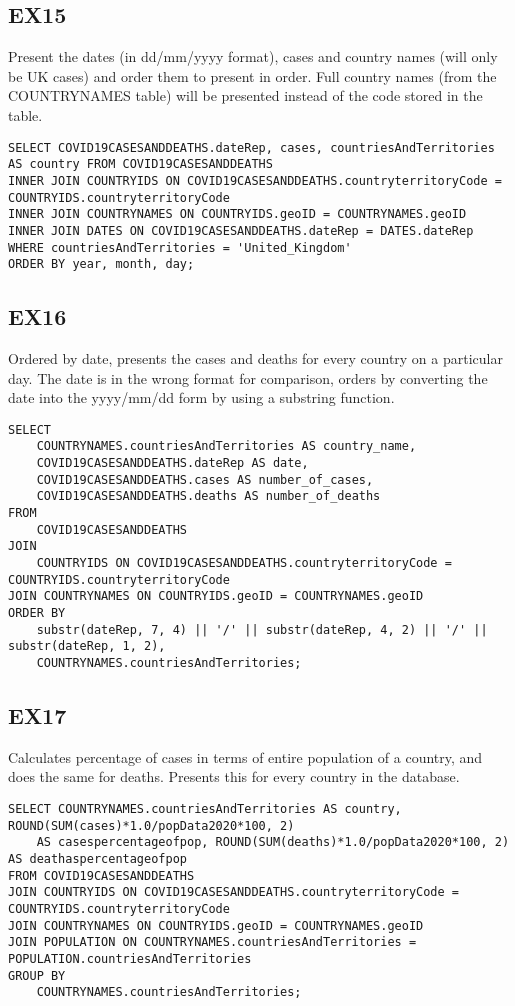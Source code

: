 \documentclass{article}
\begin{document}
\subsection{EX15}
Present the dates (in dd/mm/yyyy format), cases and country names (will only be UK cases) and order them to present in order. Full country names (from the COUNTRYNAMES table) will be presented instead of the code stored in the table. 
\begin{verbatim}
SELECT COVID19CASESANDDEATHS.dateRep, cases, countriesAndTerritories AS country FROM COVID19CASESANDDEATHS
INNER JOIN COUNTRYIDS ON COVID19CASESANDDEATHS.countryterritoryCode = COUNTRYIDS.countryterritoryCode
INNER JOIN COUNTRYNAMES ON COUNTRYIDS.geoID = COUNTRYNAMES.geoID
INNER JOIN DATES ON COVID19CASESANDDEATHS.dateRep = DATES.dateRep
WHERE countriesAndTerritories = 'United_Kingdom'
ORDER BY year, month, day;
\end{verbatim}

\subsection{EX16}
Ordered by date, presents the cases and deaths for every country on a particular day. 
The date is in the wrong format for comparison, orders by converting the date into the yyyy/mm/dd form by using a substring function. 
\begin{verbatim}
SELECT
    COUNTRYNAMES.countriesAndTerritories AS country_name,
    COVID19CASESANDDEATHS.dateRep AS date,
    COVID19CASESANDDEATHS.cases AS number_of_cases,
    COVID19CASESANDDEATHS.deaths AS number_of_deaths
FROM
    COVID19CASESANDDEATHS
JOIN
    COUNTRYIDS ON COVID19CASESANDDEATHS.countryterritoryCode = COUNTRYIDS.countryterritoryCode
JOIN COUNTRYNAMES ON COUNTRYIDS.geoID = COUNTRYNAMES.geoID
ORDER BY
    substr(dateRep, 7, 4) || '/' || substr(dateRep, 4, 2) || '/' || substr(dateRep, 1, 2),
    COUNTRYNAMES.countriesAndTerritories;
\end{verbatim}

\subsection{EX17}
Calculates percentage of cases in terms of entire population of a country, and does the same for deaths. Presents this for every country in the database. 
\begin{verbatim}
SELECT COUNTRYNAMES.countriesAndTerritories AS country, ROUND(SUM(cases)*1.0/popData2020*100, 2) 
    AS casespercentageofpop, ROUND(SUM(deaths)*1.0/popData2020*100, 2) AS deathaspercentageofpop
FROM COVID19CASESANDDEATHS
JOIN COUNTRYIDS ON COVID19CASESANDDEATHS.countryterritoryCode = COUNTRYIDS.countryterritoryCode
JOIN COUNTRYNAMES ON COUNTRYIDS.geoID = COUNTRYNAMES.geoID
JOIN POPULATION ON COUNTRYNAMES.countriesAndTerritories = POPULATION.countriesAndTerritories
GROUP BY
    COUNTRYNAMES.countriesAndTerritories;

\end{verbatim}
\end{document}
